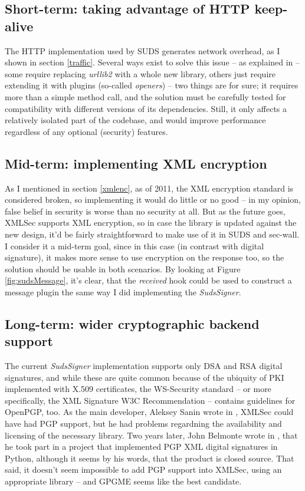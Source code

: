 \subsection{Short-term: taking advantage of HTTP keep-alive}
\label{keepalive}

The HTTP implementation used by SUDS generates network overhead, as I shown in section \ref{traffic}. Several ways exist to solve this issue -- as explained in \cite{so-1037406} -- some require replacing \emph{urllib2} with a whole new library, others just require extending it with plugins (so-called \emph{openers}) -- two things are for sure; it requires more than a simple method call, and the solution must be carefully tested for compatibility with different versions of its dependencies. Still, it only affects a relatively isolated part of the codebase, and would improve performance regardless of any optional (security) features.

\subsection{Mid-term: implementing XML encryption}

As I mentioned in section \ref{xmlenc}, as of 2011, the XML encryption standard is considered broken, so implementing it would do little or no good -- in my opinion, false belief in security is worse than no security at all. But as the future goes, XMLSec supports XML encryption, so in case the library is updated against the new design, it'd be fairly straightforward to make use of it in SUDS and sec-wall. I consider it a mid-term goal, since in this case (in contrast with digital signature), it makes more sense to use encryption on the response too, so the solution should be usable in both scenarios. By looking at Figure \ref{fig:sudsMessage}, it's clear, that the \emph{received} hook could be used to construct a message plugin the same way I did implementing the \emph{SudsSigner}.

\subsection{Long-term: wider cryptographic backend support}

The current \emph{SudsSigner} implementation supports only DSA and RSA digital signatures, and while these are quite common because of the ubiquity of PKI implemented with X.509 certificates, the WS\hyp{}Security standard -- or more specifically, the XML Signature W3C Recommendation -- contains guidelines for OpenPGP, too. As the main developer, Aleksey Sanin wrote in \cite{aleksey-pgp-mail}, XMLSec could have had PGP support, but he had problems regardning the availability and licensing of the necessary library. Two years later, John Belmonte wrote in \cite{belmonte-pgp-mail}, that he took part in a project that implemented PGP XML digital signatures in Python, although it seems by his words, that the product is closed source. That said, it doesn't seem impossible to add PGP support into XMLSec, using an appropriate library -- and GPGME \cite{gpgme-homepage} seems like the best candidate.
